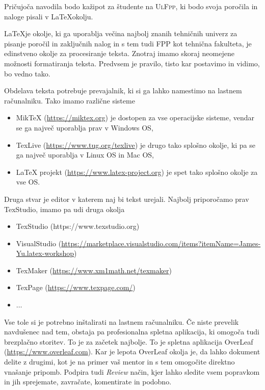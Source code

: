 \documentclass[12pt]{article}
\theoremstyle{definition}
\begin{document}
Pričujoča navodila bodo kažipot za študente na \textsc{UlFpp}, ki bodo svoja poročila in naloge pisali v \LaTeX okolju. 

\LaTeX je okolje, ki ga uporablja večina najbolj znanih tehničnih univerz za pisanje poročil in zaključnih nalog in s tem tudi \textsc{FPP} kot tehnična fakulteta, je edinstveno okolje za procesiranje teksta. Znotraj imamo skoraj neomejene možnosti formatiranja teksta. Predvsem je pravilo, tisto kar postavimo in vidimo, bo vedno tako.

Obdelava teksta potrebuje prevajalnik, ki si ga lahko namestimo na lastnem računalniku. Tako imamo različne sisteme

\begin{itemize}[nosep]
	\item MikTeX (\url{https://miktex.org}) je dostopen za vse operacijske sisteme, vendar se ga največ uporablja prav v Windows OS,
	\item TexLive (\url{https://www.tug.org/texlive}) je drugo tako splošno okolje, ki pa se ga največ uporablja v Linux OS in Mac OS,
	\item LaTeX projekt (\url{https://www.latex-project.org}) je spet tako splošno okolje za vse OS.
\end{itemize} 

Druga stvar je editor v katerem naj bi tekst urejali. Najbolj priporočamo prav TexStudio, imamo pa udi druga okolja

\begin{itemize}[nosep]
	\item TexStudio (https://www.texstudio.org)
	\item VisualStudio (\url{https://marketplace.visualstudio.com/items?itemName=James-Yu.latex-workshop})
	\item TexMaker (\url{https://www.xm1math.net/texmaker})
	\item TexPage (\url{https://www.texpage.com/})
	\item $\dots$
\end{itemize}

Vse tole si je potrebno inštalirati na lastnem računalniku. Če niste prevelik navdušenec nad tem, obstaja pa profesionalna spletna aplikacija, ki omogoča tudi brezplačno storitev. To je za začetek najbolje. To je spletna aplikacija OverLeaf (\url{https://www.overleaf.com}). Kar je lepota OverLeaf okolja je, da lahko dokument delite z drugimi, kot je na primer vaš mentor in s tem omogočite direktno vnašanje pripomb. Podpira tudi \emph{Review} način, kjer lahko sledite vsem popravkom in jih sprejemate, zavračate, komentirate in podobno.
\end{document}
